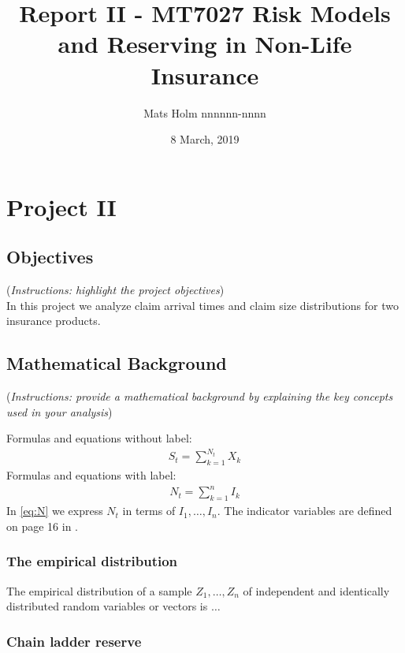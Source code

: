 \documentclass[a4paper]{article}
\title{Report II - MT7027 Risk Models and Reserving in Non-Life Insurance}
\author{Mats Holm nnnnnn-nnnn }
\date{8 March, 2019}                                           %
\begin{document}
\maketitle
\section*{Project II}
\subsection*{Objectives}
({\it Instructions: highlight the project objectives})
\\
In this project we analyze claim
arrival times and claim size distributions for two insurance products.

\subsection*{Mathematical Background}
({\it Instructions: provide a mathematical background by explaining the key concepts used in your analysis})

Formulas and equations without label:
\begin{align*}
	S_t = \sum_{k=1}^{N_t} X_k
\end{align*}
Formulas and equations with label:
\begin{align}\label{eq:N}
	N_t = \sum_{k=1}^{n} I_k
\end{align}
In \eqref{eq:N} we express $N_t$ in terms of $I_1,\dots,I_n$. The indicator variables are defined on page 16 in \cite{Wuthrich-Merz-13}.

\subsubsection*{The empirical distribution}
The empirical distribution of a sample $Z_1, \dots, Z_n$ of independent and identically distributed random variables or vectors is $\ldots$

\subsubsection*{Chain ladder reserve}
\end{document}
